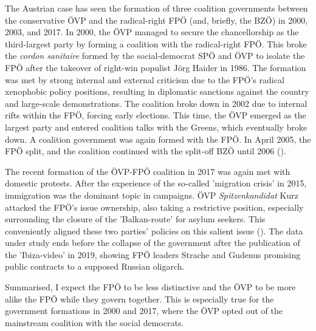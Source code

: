 \documentclass{article}
\begin{document}
The Austrian case has seen the formation of three coalition governments between the conservative ÖVP and the radical-right FPÖ (and, briefly, the BZÖ) in 2000, 2003, and 2017. In 2000, the ÖVP managed to secure the chancellorship as the third-largest party by forming a coalition with the radical-right FPÖ. This broke the \textit{cordon sanitaire} formed by the social-democrat SPÖ and ÖVP to isolate the FPÖ after the takeover of right-win populist Jörg Haider in 1986. The formation was met by strong internal and external criticism due to the FPÖ's radical xenophobic policy positions, resulting in diplomatic sanctions against the country and large-scale demonstrations. The coalition broke down in 2002 due to internal rifts within the FPÖ, forcing early elections. This time, the ÖVP emerged as the largest party and entered coalition talks with the Greens, which eventually broke down. A coalition government was again formed with the FPÖ. In April 2005, the FPÖ split, and the coalition continued with the split-off BZÖ until 2006 (\cite{Luther2010}).\par

The recent formation of the ÖVP-FPÖ coalition in 2017 was again met with domestic protests. After the experience of the so-called 'migration crisis' in 2015, immigration was the dominant topic in campaigns. ÖVP \textit{Spitzenkandidat} Kurz attacked the FPÖ's issue ownership, also taking  a restrictive position, especially surrounding the closure of the 'Balkan-route' for asylum seekers. This conveniently aligned these two parties' policies on this salient issue (\cite{Bodlos2018}). The data under study ends before the collapse of the government after the publication of the 'Ibiza-video' in 2019, showing FPÖ leaders Strache and Gudenus promising public contracts to a supposed Russian oligarch.\par 

Summarised, I expect the FPÖ to be less distinctive and the ÖVP to be more alike the FPÖ while they govern together. This is especially true for the government formations in 2000 and 2017, where the ÖVP opted out of the mainstream coalition with the social democrats. \par
\end{document}
